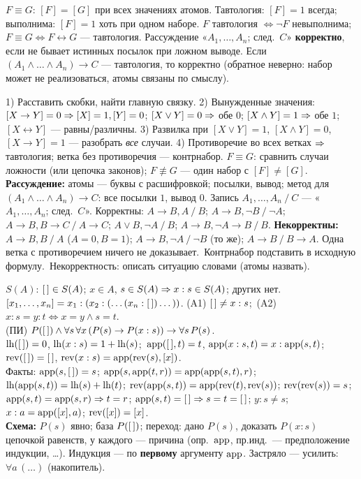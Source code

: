 { $F\equiv G$: $[F]=[G]$ при всех значениях атомов. Тавтология: $[F]=1$ всегда; выполнима: $[F]=1$ хоть при одном наборе. $F$ тавтология $\iff\neg F$ невыполнима; $F\equiv G\iff F\leftrightarrow G$ — тавтология. Рассуждение «$A_1,\dots,A_n$; след.\ $C$» \textbf{корректно}, если не бывает истинных посылок при ложном выводе. Если $(A_1\wedge\ldots\wedge A_n)\to C$ — тавтология, то корректно (обратное неверно: набор может не реализоваться, атомы связаны по смыслу).

 1) Расставить скобки, найти главную связку. 2) Вынужденные значения: $[X\to Y]=0\Rightarrow[X]=1,[Y]=0$; $[X\vee Y]=0\Rightarrow$ обе $0$; $[X\wedge Y]=1\Rightarrow$ обе $1$; $[X\leftrightarrow Y]$ — равны/различны. 3) Развилка при $[X\vee Y]=1$, $[X\wedge Y]=0$, $[X\to Y]=1$ — разобрать \emph{все} случаи. 4) Противоречие во всех ветках $\Rightarrow$ тавтология; ветка без противоречия — контрнабор. $F\equiv G$: сравнить случаи ложности (или цепочка законов); $F\not\equiv G$ — один набор с $[F]\ne[G]$.\\
\textbf{Рассуждение:} атомы — буквы с расшифровкой; посылки, вывод; метод для $(A_1\wedge\ldots\wedge A_n)\to C$: все посылки $1$, вывод $0$. Запись $A_1,\dots,A_n\mathbin{/}C$ — «$A_1,\dots,A_n$; след.\ $C$». Корректны: $A\to B,A\mathbin{/} B$; $A\to B,\neg B\mathbin{/}\neg A$; $A\to B,B\to C\mathbin{/} A\to C$; $A\vee B,\neg A\mathbin{/} B$; $A\to B,\neg A\to B\mathbin{/} B$. \textbf{Некорректны:} $A\to B,B\mathbin{/} A$ ($A=0,B=1$); $A\to B,\neg A\mathbin{/}\neg B$ (то же); $A\to B\mathbin{/} B\to A$.
\trap Одна ветка с противоречием ничего не доказывает.\ \trap Контрнабор подставить в исходную формулу.\ \trap Некорректность: описать ситуацию словами (атомы назвать).

 $S(A)$: $[\,]\in S(A)$; $x\in A$, $s\in S(A)\Rightarrow x:s\in S(A)$; других нет. $[x_1,\dots,x_n]=x_1:(x_2:(\dots(x_n:[\,])\dots))$.
(A1) $[\,]\ne x:s$;\ (A2) $x:s=y:t\iff x=y\wedge s=t$.\\
(ПИ) $P([\,])\wedge\forall s\,\forall x\,(P(s)\to P(x:s))\to\forall s\,P(s)$.\\
$\mathrm{lh}([\,])=0$, $\mathrm{lh}(x:s)=1+\mathrm{lh}(s)$;\ $\mathrm{app}([\,],t)=t$, $\mathrm{app}(x:s,t)=x:\mathrm{app}(s,t)$;\ $\mathrm{rev}([\,])=[\,]$, $\mathrm{rev}(x:s)=\mathrm{app}(\mathrm{rev}(s),[x])$.\\
Факты: $\mathrm{app}(s,[\,])=s$; $\mathrm{app}(s,\mathrm{app}(t,r))=\mathrm{app}(\mathrm{app}(s,t),r)$; $\mathrm{lh}(\mathrm{app}(s,t))=\mathrm{lh}(s)+\mathrm{lh}(t)$; $\mathrm{rev}(\mathrm{app}(s,t))=\mathrm{app}(\mathrm{rev}(t),\mathrm{rev}(s))$; $\mathrm{rev}(\mathrm{rev}(s))=s$; $\mathrm{app}(s,t)=\mathrm{app}(s,r)\Rightarrow t=r$; $\mathrm{app}(s,t)=[\,]\Rightarrow s=t=[\,]$; $y:s\ne s$; $x:a=\mathrm{app}([x],a)$; $\mathrm{rev}([x])=[x]$.\\
\textbf{Схема:} $P(s)$ явно; база $P([\,])$; переход: дано $P(s)$, доказать $P(x:s)$ цепочкой равенств, у каждого — причина (опр.\ $\mathrm{app}$, пр.инд.\ — предположение индукции, \dots). Индукция — по \textbf{первому} аргументу $\mathrm{app}$. Застряло — усилить: $\forall a\,(\dots)$ (накопитель).

}
